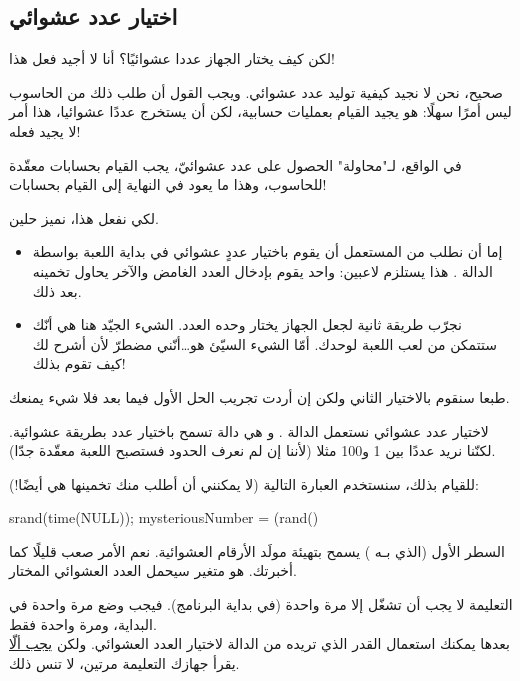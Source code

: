 \subsection{اختيار عدد عشوائي}

\begin{question}
لكن كيف يختار الجهاز عددا عشوائيًا؟ أنا لا أجيد فعل هذا!
\end{question}

صحيح، نحن لا نجيد كيفية توليد عدد عشوائي. ويجب القول أن طلب ذلك من الحاسوب ليس أمرًا سهلًا: هو يجيد القيام بعمليات حسابية، لكن أن يستخرج عددًا عشوائيا، هذا أمر لا يجيد فعله!

في الواقع، لـ"محاولة" الحصول على عدد عشوائيّ، يجب القيام بحسابات معقّدة للحاسوب، وهذا ما يعود في النهاية إلى القيام بحسابات!

لكي نفعل هذا، نميز حلين.
\begin{itemize}
	\item إما أن نطلب من المستعمل أن يقوم باختيار عددٍ عشوائي في بداية اللعبة بواسطة الدالة 
	.
	هذا يستلزم لاعبين: واحد يقوم بإدخال العدد الغامض والآخر يحاول تخمينه بعد ذلك.
	\item نجرّب طريقة ثانية لجعل الجهاز يختار وحده العدد. الشيء الجيّد هنا هي أنّك ستتمكن من لعب اللعبة لوحدك. أمّا الشيء السيّئ هو\dots أنّني مضطرّ لأن أشرح لك كيف تقوم بذلك!
\end{itemize}

طبعا سنقوم بالاختيار الثاني ولكن إن أردت تجريب الحل الأول فيما بعد فلا شيء يمنعك.

لاختيار عدد عشوائي نستعمل الدالة 
.
و هي دالة تسمح باختيار عدد بطريقة عشوائية. لكنّنا نريد عددًا بين 1 و100 مثلا (لأننا إن لم نعرف الحدود فستصبح اللعبة معقّدة جدّا).

للقيام بذلك، سنستخدم العبارة التالية (لا يمكنني أن أطلب منك تخمينها هي أيضًا!):

\begin{Csource}
srand(time(NULL));
mysteriousNumber = (rand() %
\end{Csource}

السطر الأول (الذي بـه
)
يسمح بتهيئة مولَد الأرقام العشوائية. نعم الأمر صعب قليلًا كما أخبرتك.
هو متغير سيحمل العدد العشوائي المختار.

\begin{warning}
التعليمة 
لا يجب أن تشغّل إلا مرة واحدة (في بداية البرنامج). فيجب وضع 
مرة واحدة في البداية، ومرة واحدة فقط. \\
بعدها يمكنك استعمال القدر الذي تريده من الدالة 
لاختيار العدد العشوائي. ولكن 
\underline{يجب ألّا}
 يقرأ جهازك التعليمة
مرتين، لا تنس ذلك.
\end{warning}

